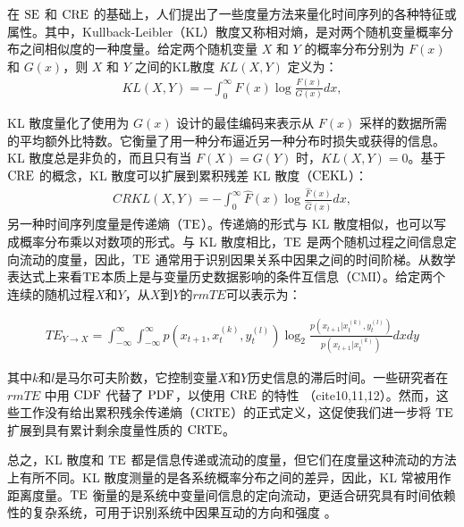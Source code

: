 在 $\rm{SE}$ 和 $\rm{CRE}$ 的基础上，人们提出了一些度量方法来量化时间序列的各种特征或属性。其中，Kullback-Leibler（KL）散度又称相对熵，是对两个随机变量概率分布之间相似度的一种度量。给定两个随机变量 $X$ 和 $Y$ 的概率分布分别为 $F(x)$ 和 $G(x)$，则 $X$ 和 $Y$ 之间的KL散度 $KL(X,Y)$ 定义为：
\begin{align}\label{KL}
KL(X,Y)=-\int_{0}^{\infty} F(x)\log \frac{F(x)}{G(x)}dx,
\end{align}

KL 散度量化了使用为 $G(x)$ 设计的最佳编码来表示从 $F(x)$ 采样的数据所需的平均额外比特数。它衡量了用一种分布逼近另一种分布时损失或获得的信息。KL 散度总是非负的，而且只有当 $F(X)=G(Y)$ 时，$KL(X,Y) = 0$。基于 $\rm{CRE}$ 的概念，KL 散度可以扩展到累积残差 KL 散度（$\rm{CEKL}$）\cite{8}：
\begin{align}\label{KL}
CRKL(X,Y)=-\int_{0}^{\infty} \hat F(x)\log \frac{\hat F(x)}{\hat G(x)}dx,
\end{align}
另一种时间序列度量是传递熵（$\rm{TE}$）。传递熵的形式与 KL 散度相似，也可以写成概率分布乘以对数项的形式。与 KL 散度相比，$\rm{TE}$ 是两个随机过程之间信息定向流动的度量，因此，$\rm{TE}$ 通常用于识别因果关系中因果之间的时间阶梯。从数学表达式上来看$\rm{TE}$本质上是与变量历史数据影响的条件互信息（CMI）。给定两个连续的随机过程$X$和$Y$，从$X$到$Y$的$rm{TE}$可以表示为\cite{9}：

\begin{align}\label{TE}
TE_{Y\rightarrow X}=\int_{-\infty}^{\infty} \int_{-\infty}^{\infty} p(x_{t+1}, x_t^{(k)}, y_{t}^{(l)}) \log_{2} \frac{p(x_{t+1}|x_t^{(k)}, y_{t}^{(l)})}{p(x_{t+1}|x_t^{(k)})} dx dy
\end{align}

其中$k$和$l$是马尔可夫阶数，它控制变量$X$和$Y$历史信息的滞后时间。一些研究者在 $rm{TE}$ 中用 $\rm{CDF}$ 代替了 $\rm{PDF}$，以使用 $\rm{CRE}$ 的特性 （cite{10,11,12}）。然而，这些工作没有给出累积残余传递熵（$\rm{CRTE}$）的正式定义，这促使我们进一步将 $\rm{TE}$ 扩展到具有累计剩余度量性质的 $\rm{CRTE}$。

总之，KL 散度和 $\rm{TE}$ 都是信息传递或流动的度量，但它们在度量这种流动的方法上有所不同。KL 散度测量的是各系统概率分布之间的差异，因此，KL 常被用作距离度量\cite{13,14,15,16}。$\rm{TE}$ 衡量的是系统中变量间信息的定向流动，更适合研究具有时间依赖性的复杂系统，可用于识别系统中因果互动的方向和强度 \cite{17,18,19,20}。

